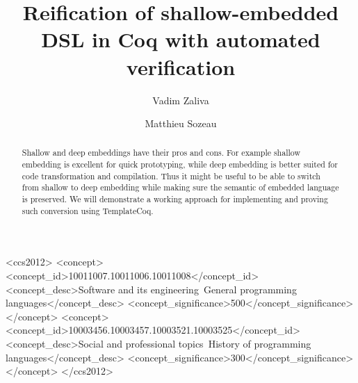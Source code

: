\documentclass[sigplan]{acmart}\settopmatter{printfolios=true,printccs=false,printacmref=false}
\begin{document}
\title{Reification of shallow-embedded DSL in Coq with automated verification}         %


\author{Vadim Zaliva}

\author{Matthieu Sozeau}


\begin{abstract}
  Shallow and deep embeddings have their pros and cons.  For example
  shallow embedding is excellent for quick prototyping, while deep
  embedding is better suited for code transformation and compilation.
  Thus it might be useful to be able to switch from shallow to deep
  embedding while making sure the semantic of embedded language is
  preserved. We will demonstrate a working approach for implementing
  and proving such conversion using TemplateCoq.
\end{abstract}


\begin{CCSXML}
<ccs2012>
<concept>
<concept_id>10011007.10011006.10011008</concept_id>
<concept_desc>Software and its engineering~General programming languages</concept_desc>
<concept_significance>500</concept_significance>
</concept>
<concept>
<concept_id>10003456.10003457.10003521.10003525</concept_id>
<concept_desc>Social and professional topics~History of programming languages</concept_desc>
<concept_significance>300</concept_significance>
</concept>
</ccs2012>
\end{CCSXML}

\end{document}
